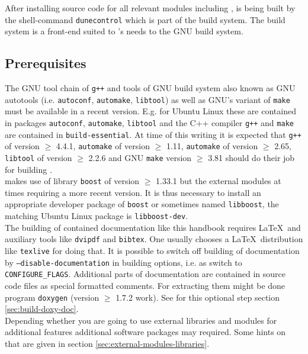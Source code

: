 After installing source code for all relevant \Dune modules including \Dumux, \Dune is being built by the shell-command \texttt{dunecontrol} which is part of the {\Dune} build system. The {\Dune} build system is a front-end suited to \Dune's needs to the GNU build system.

\subsection{Prerequisites} \label{sec:prerequisites}
The GNU tool chain of \texttt{g++}  and tools of GNU build system \cite{GNU-BS} also known as GNU autotools
(i.e. \texttt{autoconf}, \texttt{automake}, \texttt{libtool}) as well as GNU's variant of \texttt{make}
must be available in a recent version. E.g. for Ubuntu Linux these are contained in
packages \texttt{autoconf}, \texttt{automake}, \texttt{libtool}
and the C++ compiler \texttt{g++} and \texttt{make} are contained in \texttt{build-essential}.
At time of this writing it is expected that \texttt{g++} of version $\geqslant$ 4.4.1, \texttt{automake} of version $\geqslant$ 1.11,
\texttt{automake} of version $\geqslant$ 2.65,  \texttt{libtool} of version $\geqslant$ 2.2.6
and GNU \texttt{make} version $\geqslant$ 3.81 should do their job for building \Dumux.\\

\Dumux makes use of library \texttt{boost} of version $\geqslant$ 1.33.1 but the external modules at times requiring a more recent version. 
It is thus necessary to install an appropriate developer package of \texttt{boost}
or sometimes named \texttt{libboost}, the matching Ubuntu Linux package is \texttt{libboost-dev}. \\

The building of contained documentation like this handbook requires \LaTeX\  and auxiliary tools
like \texttt{dvipdf} and \texttt{bibtex}. One usually chooses a \LaTeX\  distribution like \texttt{texlive} for doing that.
It is possible to switch off building of documentation by \texttt{--disable-documentation} in building options, i.e. as switch to \texttt{CONFIGURE\_FLAGS}.
Additional parts of documentation are contained in source code files as special formatted comments.
For extracting them might be done program \texttt{doxygen} (version $\geqslant$ 1.7.2 work). See for this optional step section \ref{sec:build-doxy-doc}.\\

Depending whether you are going to use external libraries and modules for additional \Dune features 
additional software packages  may required. Some hints on that are given in section \ref{sec:external-modules-libraries}.\\

